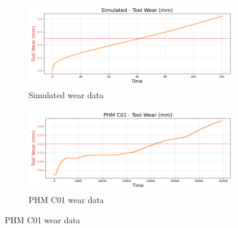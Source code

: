 \documentclass[a4paper, 12pt]{article}
\begin{document}
\begin{figure}[h]
	\begin{subfigure}[b]{0.5\textwidth}
		\centering
		\includegraphics[width=\textwidth]{Simulated_wear_plot.png}  
		\caption{Simulated wear data}
		\label{fig:simulated}
	\end{subfigure}
	\hfill
	\begin{subfigure}[b]{0.5\textwidth}
		\centering
		\includegraphics[width=\textwidth]{PHM_C01_wear_plot.png}  
		\caption{PHM C01 wear data}
		\label{fig:C01}
	\end{subfigure} \par\bigskip
	

\end{figure}
\end{document}
